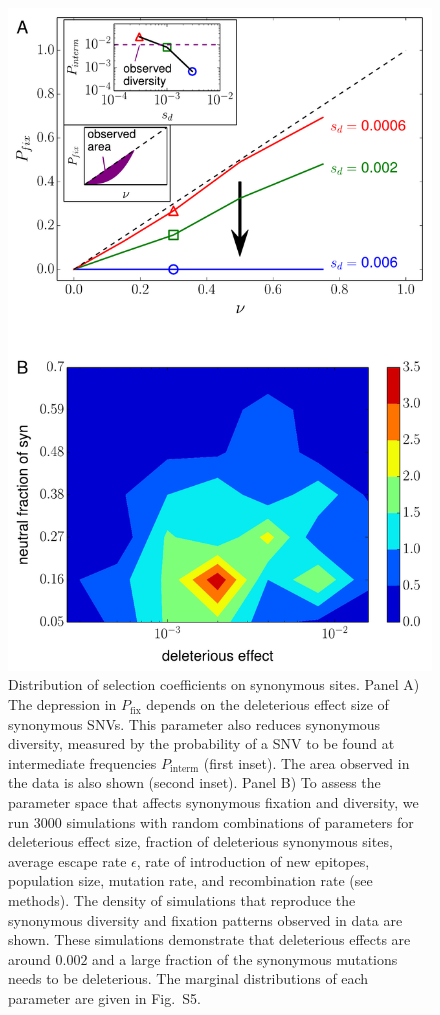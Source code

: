 \documentclass[11pt]{article}
\newcommand{\pfix}{P_{\mathrm{fix}}}
\newcommand{\marginals}{5}
\begin{document}
\begin{figure}
\begin{center}
\includegraphics[width=0.6\linewidth]{fig4}
\caption{Distribution of selection coefficients on synonymous sites. Panel A)
The depression in $\pfix$ depends on the deleterious effect size 
of synonymous SNVs. This parameter also reduces synonymous
diversity, measured by the probability of a SNV to be found at
intermediate frequencies $P_\mathrm{interm}$ (first inset). The area observed in
the data is also shown (second inset).
Panel B) To assess the parameter space that affects synonymous fixation and
diversity, we run 3000 simulations with random combinations of parameters for deleterious effect
size, fraction of deleterious synonymous sites, average escape rate $\epsilon$,
rate of introduction of new epitopes, population size, mutation rate, and
recombination rate (see methods). The density of simulations that reproduce
the synonymous diversity and fixation patterns observed in data are shown.
These simulations demonstrate that deleterious effects are around $0.002$
and a large fraction of the synonymous mutations needs to be
deleterious. The marginal distributions of each parameter are given in
Fig.~S\marginals.} 
\label{fig:simheat}
\end{center}
\end{figure}

\end{document}
